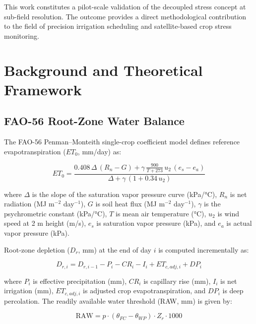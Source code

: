 \documentclass[review,12pt]{elsarticle}
\begin{document}
This work constitutes a pilot-scale validation of the decoupled stress concept at sub-field resolution. The outcome provides a direct methodological contribution to the field of precision irrigation scheduling and satellite-based crop stress monitoring.

\section{Background and Theoretical Framework}
\label{sec:theory}

\subsection{FAO-56 Root-Zone Water Balance}
\label{subsec:fao56}

The FAO-56 Penman--Monteith single-crop coefficient model defines reference evapotranspiration ($ET_0$, mm/day) as:

\begin{equation}
ET_0 = \frac{0.408\,\Delta\,(R_n - G) + \gamma\,\frac{900}{T + 273}\,u_2\,(e_s - e_a)}{\Delta + \gamma\,(1 + 0.34\,u_2)}
\label{eq:pm}
\end{equation}

\noindent where $\Delta$ is the slope of the saturation vapor pressure curve (kPa/°C), $R_n$ is net radiation (MJ m$^{-2}$ day$^{-1}$), $G$ is soil heat flux (MJ m$^{-2}$ day$^{-1}$), $\gamma$ is the psychrometric constant (kPa/°C), $T$ is mean air temperature (°C), $u_2$ is wind speed at 2 m height (m/s), $e_s$ is saturation vapor pressure (kPa), and $e_a$ is actual vapor pressure (kPa).

Root-zone depletion ($D_r$, mm) at the end of day $i$ is computed incrementally as:

\begin{equation}
D_{r,i} = D_{r,i-1} - P_i - CR_i - I_i + ET_{c,adj,i} + DP_i
\label{eq:depletion}
\end{equation}

\noindent where $P_i$ is effective precipitation (mm), $CR_i$ is capillary rise (mm), $I_i$ is net irrigation (mm), $ET_{c,adj,i}$ is adjusted crop evapotranspiration, and $DP_i$ is deep percolation. The readily available water threshold (RAW, mm) is given by:

\begin{equation}
\text{RAW} = p \cdot (\theta_{FC} - \theta_{WP}) \cdot Z_r \cdot 1000
\label{eq:raw}
\end{equation}
\end{document}
